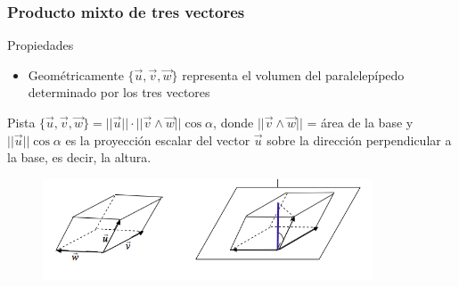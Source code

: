 \documentclass{beamer}
\begin{document}
\begin{frame}
  \frametitle{Producto mixto de tres vectores}
    \begin{block}{Propiedades}
\begin{itemize}
\item Geom\'etricamente $\{\vec u, \vec v,\vec w\}$ representa el volumen del paralelep\'ipedo determinado por los tres vectores
\end{itemize}
\end{block}
Pista $\{\vec u, \vec v,\vec w\} = ||\vec u || \cdot ||\vec v \wedge \vec w|| \cos \alpha $, donde $||\vec v \wedge \vec w||$ = \'area de la base y $||\vec u || \cos \alpha$ es la proyecci\'on escalar del vector $\vec u$ sobre la direcci\'on perpendicular a la base, es decir, la altura.
  
  \begin{figure}[h]
    \label{fig:volumen}
\centering
\includegraphics[height=3cm]{volum}
\end{figure}

\end{frame}
\end{document}
